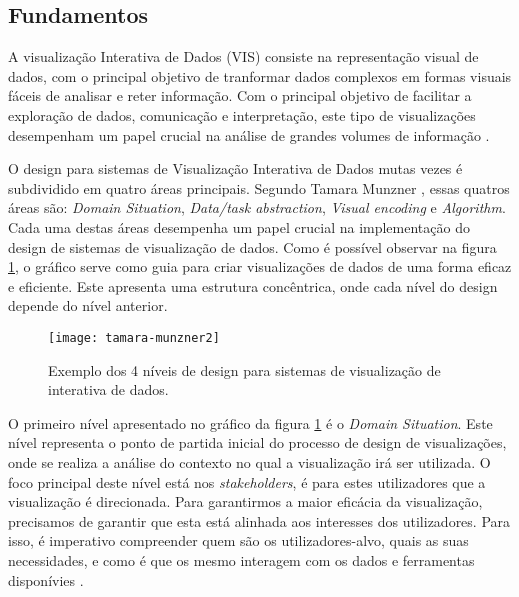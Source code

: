 \subsection{Fundamentos} %
\label{sub:fundamentos}
A visualização Interativa de Dados (VIS) consiste na representação visual de dados, com o principal objetivo de tranformar dados complexos em formas visuais fáceis de analisar e reter informação. Com o principal objetivo de facilitar a exploração de dados, comunicação e interpretação, este tipo de visualizações desempenham um papel crucial na análise de grandes volumes de informação \cite{keim2002information}.
                                                                                                                        
O design para sistemas de Visualização Interativa de Dados mutas vezes é subdividido em quatro áreas principais. Segundo Tamara Munzner \cite{munzner2014visualization}, essas quatros áreas são: \textit{Domain Situation}, \textit{Data/task abstraction}, \textit{Visual encoding} e \textit{Algorithm}. Cada uma destas áreas desempenha um papel crucial na implementação do design de sistemas de visualização de dados. Como é possível observar na figura \ref{fig:tamara-munzner-principles}, o gráfico serve como guia para criar visualizações de dados de uma forma eficaz e eficiente. Este apresenta uma estrutura concêntrica, onde cada nível do design depende do nível anterior.

\begin{figure}[htbp]
  \centering
  \texttt{[image: tamara-munzner2]}
  \caption{Exemplo dos 4 níveis de design para sistemas de visualização de interativa de dados.}
  \label{fig:tamara-munzner-principles}
\end{figure}

O primeiro nível apresentado no gráfico da figura \ref{fig:tamara-munzner-principles} é o \textit{Domain Situation}. Este nível representa o ponto de partida inicial do processo de design de visualizações, onde se realiza a análise do contexto no qual a visualização irá ser utilizada. O foco principal deste nível está nos \textit{stakeholders}, é para estes utilizadores que a visualização é direcionada.
Para garantirmos a maior eficácia da visualização, precisamos de garantir que esta está alinhada aos interesses dos utilizadores. Para isso, é imperativo compreender quem são os utilizadores-alvo, quais as suas necessidades, e como é que os mesmo interagem com os dados e ferramentas disponívies \cite{courage2005understanding}.

